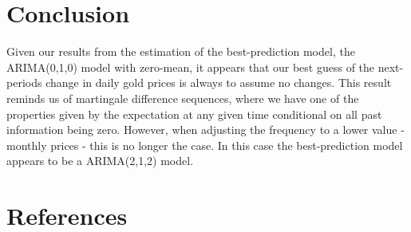 \documentclass[a4paper]{article}
\theoremstyle{definition}
\begin{document}
\section{Conclusion}
Given our results from the estimation of the best-prediction model, the ARIMA(0,1,0) model with zero-mean, it appears that our best guess of the next-periods change in daily gold prices is always to assume no changes. This result reminds us of martingale difference sequences, where we have one of the properties given by the expectation at any given time conditional on all past information being zero. However, when adjusting the frequency to a lower value - monthly prices - this is no longer the case. In this case the best-prediction model appears to be a ARIMA(2,1,2) model. 
%
%
%
%
%
%
%
%
\newpage
{}
\section*{References}
\printbibliography
\end{document}
